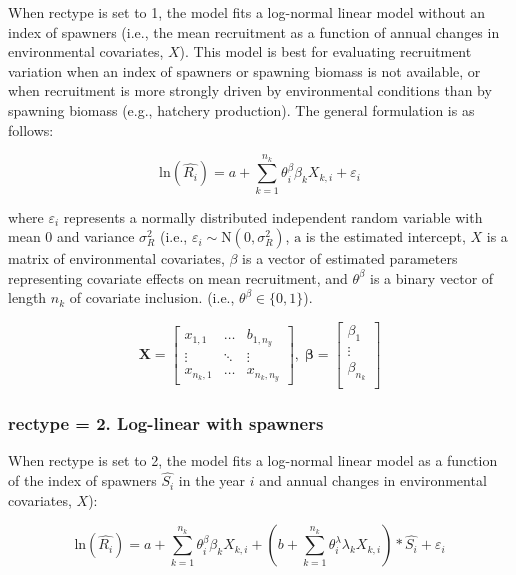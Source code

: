 \documentclass[
]{article}
\begin{document}
When rectype is set to 1, the model fits a log-normal linear model
without an index of spawners (i.e., the mean recruitment as a function
of annual changes in environmental covariates, \({X}\)). This model is
best for evaluating recruitment variation when an index of spawners or
spawning biomass is not available, or when recruitment is more strongly
driven by environmental conditions than by spawning biomass (e.g.,
hatchery production). The general formulation is as follows:

\[ \mathrm{ln}(\hat{R_i})= a+\sum_{k=1}^{n_k}{\theta_i^{\beta}\beta_k X_{k,i}}+\varepsilon_i \]

where \(\varepsilon_i\) represents a normally distributed independent
random variable with mean 0 and variance \(\sigma^2_R\) (i.e.,
\(\varepsilon_i\sim \mathrm N(0,\sigma^2_R)\), \(\mathrm a\) is the
estimated intercept, \({X}\) is a matrix of environmental covariates,
\(\beta\) is a vector of estimated parameters representing covariate
effects on mean recruitment, and \({\theta^{\beta}}\) is a binary vector
of length \(n_k\) of covariate inclusion. (i.e.,
\({\theta^{\beta}} \in \{0,1 \}\)).

\[\mathbf{X} = \left[\begin{array}
{rrr}
x_{1,1} & \dots  & b_{1,n_y} \\
\vdots & \ddots & \vdots \\
x_{n_k,1} & \dots  & x_{n_k,n_y} 
\end{array}\right]
,\; \mathbf{\beta} = \left[\begin{array}
{rrr}
\beta_1 \\
\vdots  \\
\beta_{n_k} \\
\end{array}\right]
\]

\hypertarget{rectype-2.-log-linear-with-spawners}{%
\subsubsection{rectype = 2. Log-linear with
spawners}\label{rectype-2.-log-linear-with-spawners}}

When rectype is set to 2, the model fits a log-normal linear model as a
function of the index of spawners \(\hat{S_i}\) in the year \(i\) and
annual changes in environmental covariates, \({X}\)):

\[\mathrm{ln}(\hat{R_i})= a + \sum_{k=1}^{n_k}{\theta_i^{\beta}\beta_k X_{k,i}}+ (b+\sum_{k=1}^{n_k}{\theta_i^{\lambda}\lambda_k X_{k,i}})* \hat{S_i}+\varepsilon_i\]
\end{document}

